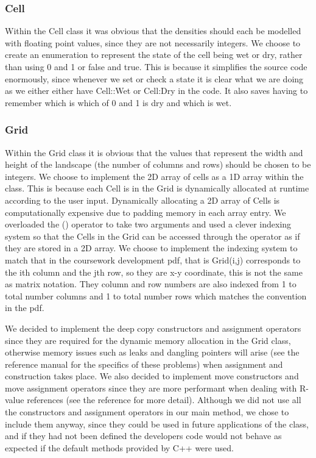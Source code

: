 \subsubsection{Cell}
Within the Cell class it was obvious that the densities should each be modelled with floating point values, since they are not necessarily integers. We choose to create an enumeration to represent the state of the cell being wet or dry, rather than using 0 and 1 or false and true. This is because it simplifies the source code enormously, since whenever we set or check a state it is clear what we are doing as we either either have Cell::Wet or Cell:Dry in the code. It also saves having to remember which is which of 0 and 1 is dry and which is wet. 

\subsubsection{Grid}
Within the Grid class it is obvious that the values that represent the width and height of the landscape (the number of columns and rows) should be chosen to be integers. We choose to implement the 2D array of cells as a 1D array within the class. This is because each Cell is in the Grid is dynamically allocated at runtime according to the user input. Dynamically allocating a 2D array of Cells is computationally expensive due to padding memory in each array entry. We overloaded the () operator to take two arguments and used a clever indexing system so that the Cells in the Grid can be accessed through the operator as if they are stored in a 2D array. We choose to implement the indexing system to match that in the coursework development pdf, that is Grid(i,j) corresponds to the ith column and the jth row, so they are x-y coordinate, this is not the same as matrix notation. They column and row numbers are also indexed from 1 to total number columns and 1 to total number rows which matches the convention in the pdf.

We decided to implement the deep copy constructors and assignment operators since they are required for the dynamic memory allocation in the Grid class, otherwise memory issues such as leaks and dangling pointers will arise (see the reference manual for the specifics of these problems) when assignment and construction takes place. We also decided to implement move constructors and move assignment operators since they are more performant when dealing with R-value references (see the reference for more detail). Although we did not use all the constructors and assignment operators in our main method, we chose to include them anyway, since they could be used in future applications of the class, and if they had not been defined the developers code would not behave as expected if the default methods provided by C++ were used.   



